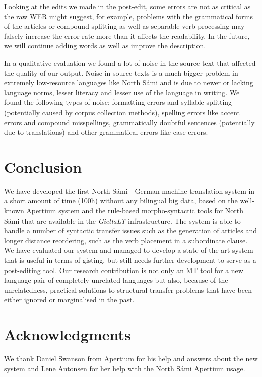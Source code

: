 \documentclass{flammie}
\begin{document}
Looking at the edits we made in the post-edit, some errors are not as critical
as the raw WER might suggest, for example, problems with the grammatical forms
of the articles or compound splitting as well as separable verb processing may
falsely increase the error rate more than it affects the readability.  In the
future, we will continue adding words as well as improve the description.

In a qualitative evaluation we found a lot of noise in the source text that
affected the quality of our output.  Noise in source texts is a much bigger
problem in extremely low-resource languages like North Sámi and is due to newer
or lacking language norms, lesser literacy and lesser use of the language in
writing. \cite{wiechetek-EtAl:2022:LREC} We found the following types of noise:
formatting errors and syllable splitting (potentially caused by corpus
collection methods), spelling errors like accent errors and compound
misspellings, grammatically doubtful sentences (potentially due to translations)
and other grammatical errors like case errors.




\section{Conclusion}

We have developed the first North Sámi - German machine translation system in a
short amount of time (100h) without any bilingual big data, based on the
well-known Apertium system and the rule-based morpho-syntactic tools for North
Sámi that are available in the  \textit{GiellaLT} infrastructure.  The system is
able to handle a number of syntactic transfer issues such as the generation of
articles and longer distance reordering, such as the verb placement in a
subordinate clause.  We have evaluated our system and managed to develop a
state-of-the-art system that is useful in terms of gisting, but still needs
further development to serve as a post-editing tool.  Our research contribution
is not only an MT tool for a new language pair of completely unrelated languages
but also, because of the unrelatedness, practical solutions to structural
transfer problems that have been either ignored or marginalised in the past.

\section*{Acknowledgments}
We thank Daniel Swanson from Apertium for his help and answers about the new system and Lene Antonsen for her help with the North Sámi Apertium usage.



\end{document}
